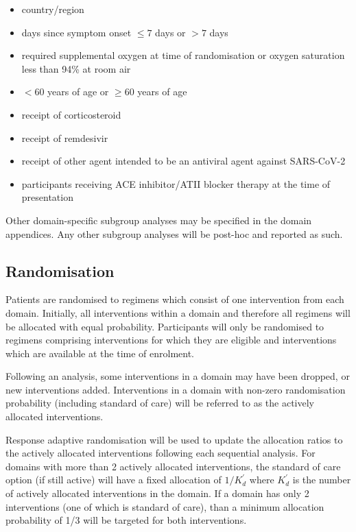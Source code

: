 \documentclass[
  11pt,
]{article}
\providecommand{\tightlist}{%
  \setlength{\itemsep}{0pt}\setlength{\parskip}{0pt}}
\begin{document}
\begin{itemize}
\tightlist
\item
  country/region
\item
  days since symptom onset \(\leq 7\) days or \(> 7\) days
\item
  required supplemental oxygen at time of randomisation or oxygen saturation less than 94\% at room air
\item
  \(<60\) years of age or \(\geq 60\) years of age
\item
  receipt of corticosteroid
\item
  receipt of remdesivir
\item
  receipt of other agent intended to be an antiviral agent against SARS-CoV-2
\item
  participants receiving ACE inhibitor/ATII blocker therapy at the time of presentation
\end{itemize}

Other domain-specific subgroup analyses may be specified in the domain appendices.
Any other subgroup analyses will be post-hoc and reported as such.

\hypertarget{randomisation}{%
\subsection{Randomisation}\label{randomisation}}

Patients are randomised to regimens which consist of one intervention from each domain.
Initially, all interventions within a domain and therefore all regimens will be allocated with equal probability.
Participants will only be randomised to regimens comprising interventions for which they are eligible and interventions which are available at the time of enrolment.

Following an analysis, some interventions in a domain may have been dropped, or new interventions added.
Interventions in a domain with non-zero randomisation probability (including standard of care) will be referred to as the actively allocated interventions.

Response adaptive randomisation will be used to update the allocation ratios to the actively allocated interventions following each sequential analysis.
For domains with more than 2 actively allocated interventions, the standard of care option (if still active) will have a fixed allocation of \(1/K^\prime_d\) where \(K^\prime_d\) is the number of actively allocated interventions in the domain.
If a domain has only 2 interventions (one of which is standard of care), than a minimum allocation probability of 1/3 will be targeted for both interventions.
\end{document}
